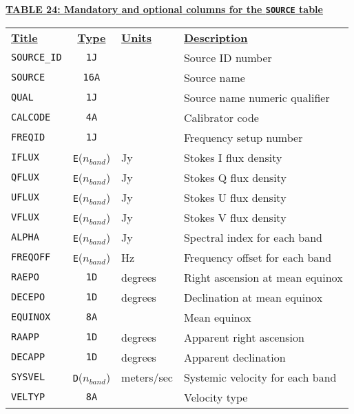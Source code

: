 \documentclass[twoside]{article}
\newcommand{\Hi}[1]{\textcolor{hicol}{#1}}
\newcommand{\Me}[1]{\textcolor{mecol}{#1}}
\newcommand{\nband}{$n_{band}$}
\begin{document}
\begin{center}
\underline{\bf{TABLE \Hi{24}: Mandatory \Me{and optional} columns for
    the {\tt SOURCE} table}}\\
\begin{tabular}{lcll}
\noalign{\vspace{2pt}}
\underline{{\bf Title\vphantom{y}}} & \underline{\bf{Type}} &
   \underline{{\bf Units\vphantom{y}}} & \underline{\bf{Description}} \\
\noalign{\vspace{2pt}}
{\tt SOURCE\_ID} & {\tt 1J}  &         & Source ID number \\
{\tt SOURCE}     & {\tt 16A} &         & Source name \\
{\tt QUAL}       & {\tt 1J}  &         & Source \Hi{name numeric} qualifier \\
{\tt CALCODE}    & {\tt 4A}  &         & Calibrator code \\
{\tt FREQID}     & {\tt 1J}  &         & Frequency \Hi{setup number} \\
{\tt IFLUX}      & {\tt E}(\nband) & Jy & Stokes I flux density \\
{\tt QFLUX}      & {\tt E}(\nband) & Jy & Stokes Q flux density \\
{\tt UFLUX}      & {\tt E}(\nband) & Jy & Stokes U flux density \\
{\tt VFLUX}      & {\tt E}(\nband) & Jy & Stokes V flux density \\
{\tt ALPHA}      & {\tt E}(\nband) & Jy & Spectral index for each band \\
{\tt FREQOFF}    & {\tt E}(\nband) & Hz & Frequency offset for each band \\
{\tt RAEPO}      & {\tt 1D}   & degrees & Right ascension at mean
                                          equinox \\
{\tt DECEPO}     & {\tt 1D}   & degrees & Declination at mean
                                          \Hi{equinox} \\
{\tt EQUINOX}    & {\tt 8A}   &         & Mean equinox \\
{\tt RAAPP}      & {\tt 1D}   & degrees & Apparent right ascension \\
{\tt DECAPP}     & {\tt 1D}   & degrees & Apparent declination \\
{\tt SYSVEL}     & {\tt D}(\nband) & meters/sec & Systemic velocity
                                        for each band \\
{\tt VELTYP}     & {\tt 8A} &           & Velocity type \\

\end{tabular}
\end{center}
\end{document}
